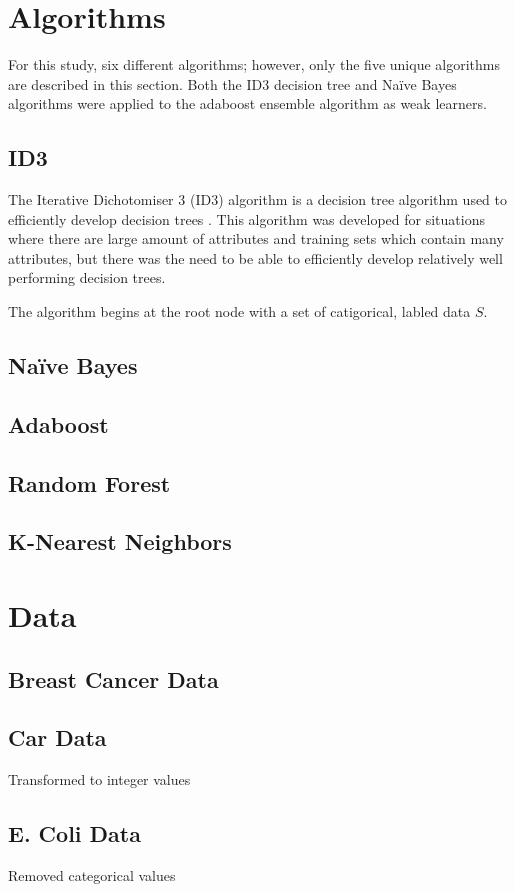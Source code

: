 \documentclass[11pt]{article}
\begin{document}
\section{Algorithms}
For this study, six different algorithms; however, only the five unique algorithms are described in this section. Both the ID3 decision tree and Naïve Bayes algorithms were applied to the adaboost ensemble algorithm as weak learners.

\subsection{ID3}
The Iterative Dichotomiser 3 (ID3) algorithm is a decision tree algorithm used to efficiently develop decision trees \cite{Quinlan:1986:IDT:637962.637969}. This algorithm was developed for situations where there are large amount of attributes and training sets which contain many attributes, but there was the need to be able to efficiently develop relatively well performing decision trees.

The algorithm begins at the root node with a set of catigorical, labled data $S$.

\subsection{Naïve Bayes}
\subsection{Adaboost}
\subsection{Random Forest}
\subsection{K-Nearest Neighbors}

\section{Data}
\subsection{Breast Cancer Data}
\subsection{Car Data}
Transformed to integer values

\subsection{E. Coli Data}
Removed categorical values
\end{document}
